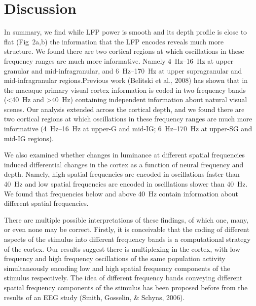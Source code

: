 \section{Discussion}
In summary, we find while \ac{LFP} power is smooth and its depth profile is close to flat (Fig~2a,b) the information that the \ac{LFP} encodes reveals much more structure.
We found there are two cortical regions at which oscillations in these frequency ranges are much more informative.
Namely \SIrange{4}{16}{Hz} at upper granular and mid-infragranular, and \SIrange{6}{170}{Hz} at upper supragranular and mid{}-infragranular regions.Previous work (Belitski et al., 2008) has shown that in the macaque primary visual cortex information is coded in two frequency bands (\SI{<40}{Hz} and \SI{>40}{Hz}) containing independent information about natural visual scenes.
Our analysis extended across the cortical depth, and we found there are two cortical regions at which oscillations in these frequency ranges are much more informative (\SIrange{4}{16}{Hz} at upper-\ac{G} and mid-\ac{IG}; \SIrange{6}{170}{Hz} at upper-\ac{SG} and mid-\ac{IG} regions).

We also examined whether changes in luminance at different spatial frequencies induced differential changes in the cortex as a function of neural frequency and depth.
Namely, high spatial frequencies are encoded in oscillations faster than \SI{40}{Hz} and low spatial frequencies are encoded in oscillations slower than \SI{40}{Hz}.
We found that frequencies below and above \SI{40}{Hz} contain information about different spatial frequencies.

There are multiple possible interpretations of these findings, of which one, many, or even none may be correct.
Firstly, it is conceivable that the coding of different aspects of the stimulus into different frequency bands is a computational strategy of the cortex.
Our results suggest there is multiplexing in the cortex, with low frequency and high frequency oscillations of the same population activity simultaneously encoding low and high spatial frequency components of the stimulus respectively.
The idea of different frequency bands conveying different spatial frequency components of the stimulus has been proposed before from the results of an \ac{EEG} study (Smith, Gosselin, \& Schyns, 2006).

